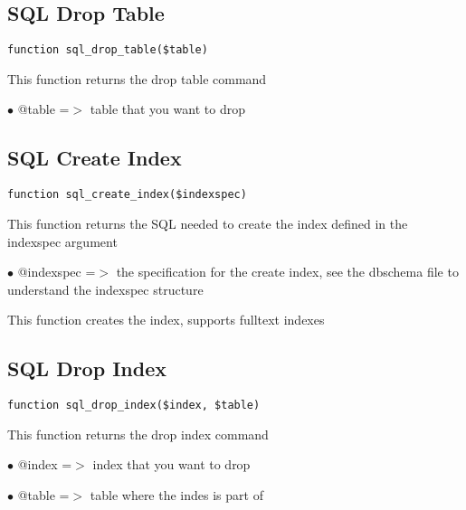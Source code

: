 \documentclass[a4paper]{book}
\begin{document}
\hypertarget{toc255}{}
\subsection{SQL Drop Table}

\begin{lstlisting}
function sql_drop_table($table)
\end{lstlisting}

This function returns the drop table command

\begin{compactitem}
\item[\color{myblue}$\bullet$] @table =$>$ table that you want to drop
\end{compactitem}

\hypertarget{toc256}{}
\subsection{SQL Create Index}

\begin{lstlisting}
function sql_create_index($indexspec)
\end{lstlisting}

This function returns the SQL needed to create the index defined in the
indexspec argument

\begin{compactitem}
\item[\color{myblue}$\bullet$] @indexspec =$>$ the specification for the create index, see the dbschema
              file to understand the indexspec structure
\end{compactitem}

This function creates the index, supports fulltext indexes

\hypertarget{toc257}{}
\subsection{SQL Drop Index}

\begin{lstlisting}
function sql_drop_index($index, $table)
\end{lstlisting}

This function returns the drop index command

\begin{compactitem}
\item[\color{myblue}$\bullet$] @index =$>$ index that you want to drop
\item[\color{myblue}$\bullet$] @table =$>$ table where the indes is part of
\end{compactitem}
\end{document}
